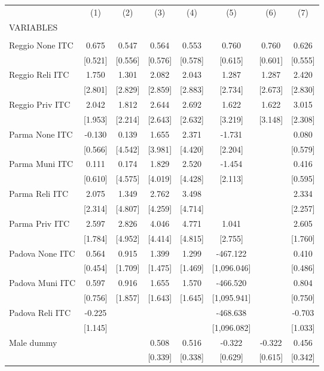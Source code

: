 \begin{tabular}{lccccccc} \hline
 & (1) & (2) & (3) & (4) & (5) & (6) & (7) \\
VARIABLES &  &  &  &  &  &  &  \\ \hline
 &  &  &  &  &  &  &  \\
Reggio None ITC & 0.675 & 0.547 & 0.564 & 0.553 & 0.760 & 0.760 & 0.626 \\
 & [0.521] & [0.556] & [0.576] & [0.578] & [0.615] & [0.601] & [0.555] \\
Reggio Reli ITC & 1.750 & 1.301 & 2.082 & 2.043 & 1.287 & 1.287 & 2.420 \\
 & [2.801] & [2.829] & [2.859] & [2.883] & [2.734] & [2.673] & [2.830] \\
Reggio Priv ITC & 2.042 & 1.812 & 2.644 & 2.692 & 1.622 & 1.622 & 3.015 \\
 & [1.953] & [2.214] & [2.643] & [2.632] & [3.219] & [3.148] & [2.308] \\
Parma None ITC & -0.130 & 0.139 & 1.655 & 2.371 & -1.731 &  & 0.080 \\
 & [0.566] & [4.542] & [3.981] & [4.420] & [2.204] &  & [0.579] \\
Parma Muni ITC & 0.111 & 0.174 & 1.829 & 2.520 & -1.454 &  & 0.416 \\
 & [0.610] & [4.575] & [4.019] & [4.428] & [2.113] &  & [0.595] \\
Parma Reli ITC & 2.075 & 1.349 & 2.762 & 3.498 &  &  & 2.334 \\
 & [2.314] & [4.807] & [4.259] & [4.714] &  &  & [2.257] \\
Parma Priv ITC & 2.597 & 2.826 & 4.046 & 4.771 & 1.041 &  & 2.605 \\
 & [1.784] & [4.952] & [4.414] & [4.815] & [2.755] &  & [1.760] \\
Padova None ITC & 0.564 & 0.915 & 1.399 & 1.299 & -467.122 &  & 0.410 \\
 & [0.454] & [1.709] & [1.475] & [1.469] & [1,096.046] &  & [0.486] \\
Padova Muni ITC & 0.597 & 0.916 & 1.655 & 1.570 & -466.520 &  & 0.804 \\
 & [0.756] & [1.857] & [1.643] & [1.645] & [1,095.941] &  & [0.750] \\
Padova Reli ITC & -0.225 &  &  &  & -468.638 &  & -0.703 \\
 & [1.145] &  &  &  & [1,096.082] &  & [1.033] \\
Male dummy &  &  & 0.508 & 0.516 & -0.322 & -0.322 & 0.456 \\
 &  &  & [0.339] & [0.338] & [0.629] & [0.615] & [0.342] \\

\end{tabular}

